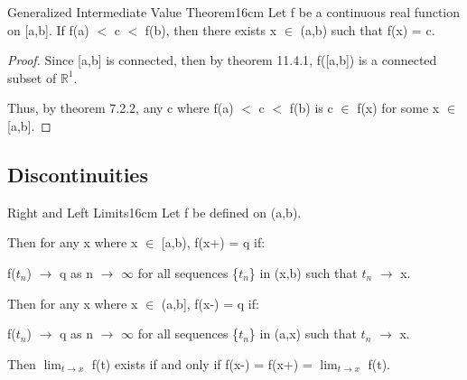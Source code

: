     \newpage



    \begin{wtheorem}{Generalized Intermediate Value Theorem}{16cm}
        Let f be a continuous real function on [a,b]. If f(a) $<$ c $<$ f(b),
        then there exists x $\in$ (a,b) such that f(x) = c.
    \end{wtheorem}

    \begin{proof}
        Since [a,b] is connected, then by {\color{red} theorem 11.4.1},
        f([a,b]) is a connected subset of $\mathbb{R}^1$.

        Thus, by {\color{red} theorem 7.2.2}, any c where f(a) $<$ c $<$ f(b)
        is c $\in$ f(x) for some x $\in$ [a,b].
    \end{proof}

    \vspace{0.5cm}





\subsection{ Discontinuities }

    \begin{definition}{Right and Left Limits}{16cm}
        \small
        Let f be defined on (a,b).
        
        \vspace{0.2cm}

        Then for any x where x $\in$ [a,b), f(x+) = q if:
        
        \hspace{1cm}
        f($t_n$) $\rightarrow$ q as n $\rightarrow$ $\infty$
        for all sequences \{$t_n$\} in (x,b) such that $t_n$ $\rightarrow$ x.

        \vspace{0.2cm}

        Then for any x where x $\in$ (a,b], f(x-) = q if:
        
        \hspace{1cm}
        f($t_n$) $\rightarrow$ q as n $\rightarrow$ $\infty$
        for all sequences \{$t_n$\} in (a,x) such that $t_n$ $\rightarrow$ x.

        \vspace{0.2cm}

        Then $\lim_{t \rightarrow x}$ f(t) exists if and only if
        f(x-) = f(x+) = $\lim_{t \rightarrow x}$ f(t).
    \end{definition}

